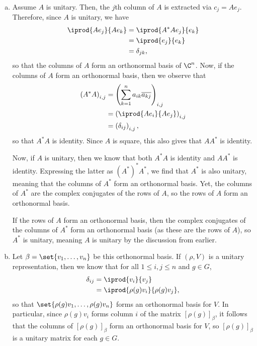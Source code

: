 \documentclass[10pt]{mypackage}
\begin{document}
\begin{solution}\hfill
  \begin{enumerate}[(a)]
    \item Assume $A$ is unitary. Then, the $j$th column of $A$ is extracted via $c_j = Ae_j$. Therefore, since $A$ is unitary, we have
      \begin{align*}
        \iprod{Ae_j}{Ae_k} &= \iprod{A^{\ast}Ae_j}{e_k}\\
                           &= \iprod{e_j}{e_k}\\
                           &= \delta_{jk},
      \end{align*}
      so that the columns of $A$ form an orthonormal basis of $\C^n$. Now, if the columns of $A$ form an orthonormal basis, then we observe that
      \begin{align*}
        \left( A^{\ast}A \right)_{i,j} &= \left( \sum_{k=1}^{n}a_{ik} \overline{a_{kj}} \right)_{i,j}\\
                                       &= \left( \iprod{Ae_i}{Ae_j} \right)_{i,j}\\
                                       &= \left( \delta_{ij} \right)_{i,j},
      \end{align*}
      so that $A^{\ast}A$ is identity. Since $A$ is square, this also gives that $AA^{\ast}$ is identity.

      Now, if $A$ is unitary, then we know that both $A^{\ast}A$ is identity and $AA^{\ast}$ is identity. Expressing the latter as $\left( A^{\ast} \right)^{\ast}A^{\ast}$, we find that $A^{\ast}$ is also unitary, meaning that the columns of $A^{\ast}$ form an orthonormal basis. Yet, the columns of $A^{\ast}$ are the complex conjugates of the rows of $A$, so the rows of $A$ form an orthonormal basis.

      If the rows of $A$ form an orthonormal basis, then the complex conjugates of the columns of $A^{\ast}$ form an orthonormal basis (as these are the rows of $A$), so $A^{\ast}$ is unitary, meaning $A$ is unitary by the discussion from earlier.
    \item Let $\beta = \set{v_1,\dots,v_n}$ be this orthonormal basis. If $\left( \rho,V \right)$ is a unitary representation, then we know that for all $1\leq i,j\leq n$ and $g\in G$,
      \begin{align*}
        \delta_{ij} &= \iprod{v_i}{v_j}\\
                    &= \iprod{\rho(g)v_i}{\rho(g)v_j},
      \end{align*}
      so that $\set{\rho(g)v_1,\dots,\rho(g)v_n}$ forms an orthonormal basis for $V$. In particular, since $\rho(g)v_i$ forms column $i$ of the matrix $\left[ \rho(g) \right]_{\beta}$, it follows that the columns of $\left[ \rho(g) \right]_{\beta}$ form an orthonormal basis for $V$, so $\left[ \rho(g) \right]_{\beta}$ is a unitary matrix for each $g\in G$.


\end{enumerate}
\end{solution}
\end{document}

